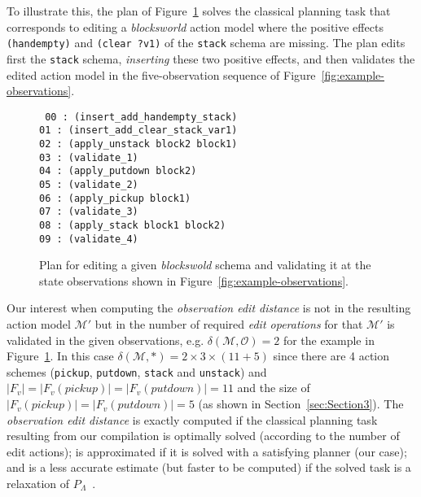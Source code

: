 \documentclass[3p,times]{elsarticle}
\begin{document}
To illustrate this, the plan of Figure~\ref{fig:plan-odistance} solves the classical planning task that corresponds to editing a \emph{blocksworld} action model where the positive effects {\tt\small (handempty)} and {\tt\small (clear ?v1)} of the {\tt\small stack} schema are missing. The plan edits first the {\tt\small stack} schema, {\em inserting} these two positive effects, and then validates the edited action model in the five-observation sequence of Figure~\ref{fig:example-observations}.

\begin{figure}[hbt!]
{\tt\small
00 : (insert\_add\_handempty\_stack)\\
01 : (insert\_add\_clear\_stack\_var1)\\
02 : (apply\_unstack block2 block1)\\
03 : (validate\_1)\\
04 : (apply\_putdown block2)\\
05 : (validate\_2)\\
06 : (apply\_pickup block1)\\
07 : (validate\_3)\\
08 : (apply\_stack block1 block2)\\
09 : (validate\_4)\\
}
 \caption{\small Plan for editing a given {\em blockswold} schema and validating it at the state observations shown in Figure~\ref{fig:example-observations}.}
\label{fig:plan-odistance}
\end{figure}

Our interest when computing the {\em observation edit distance} is not in the resulting action model $\mathcal{M}'$ but in the number of required {\em edit operations} for that $\mathcal{M}'$ is validated in the given observations, e.g. $\delta(\mathcal{M},\mathcal{O})=2$ for the example in Figure~\ref{fig:plan-odistance}. In this case $\delta(\mathcal{M},*)=2\times 3\times (11+5)$ since there are 4 action schemes ({\small\tt pickup}, {\small\tt putdown}, {\small\tt stack} and {\small\tt unstack}) and $|F_v|=|F_v(pickup)|=|F_v(putdown)|=11$ and the size of $|F_v(pickup)|=|F_v(putdown)|=5$  (as shown in Section~\ref{sec:Section3}). The {\em observation edit distance} is exactly computed if the classical planning task resulting from our compilation is optimally solved (according to the number of edit actions); is approximated if it is solved with a satisfying planner (our case); and is a less accurate estimate (but faster to be computed) if the solved task is a relaxation of $P_{\Lambda}$~\cite{bonet2001planning}.
\end{document}
